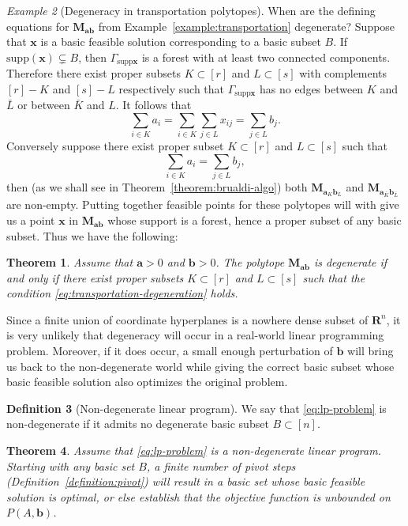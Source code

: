 \documentclass{amsbook}
\newcommand{\xx}{\mathbf x}
\newcommand{\bb}{\mathbf b}
\renewcommand{\aa}{\mathbf a}
\newcommand{\supp}{\mathrm{supp}}
\newcommand{\RR}{\mathbf R}
\newcommand{\MM}{\mathbf M}
\newtheorem{theorem}{Theorem}[section]
\theoremstyle{definition}
\newtheorem{definition}[theorem]{Definition}
\theoremstyle{remark}
\newtheorem{example}[theorem]{Example}
\begin{document}
\begin{example}
  [Degeneracy in transportation polytopes]
  When are the defining equations for $\MM_{\aa\bb}$ from Example~\ref{example:transportation} degenerate?
  Suppose that $\xx$ is a basic feasible solution corresponding to a basic subset $B$.
  If $\supp(\xx)\subsetneq B$, then $\Gamma_{\supp\xx}$ is a forest with at least two connected components.
  Therefore there exist proper subsets $K\subset [r]$ and $L\subset [s]$ with complements $[r]-K$ and $[s]-L$ respectively such that $\Gamma_{\supp\xx}$ has no edges between $K$ and $\bar L$ or between $\bar K$ and $L$.
  It follows that
  \begin{displaymath}
    \sum_{i\in K} a_i = \sum_{i\in K}\sum_{j\in L} x_{ij} = \sum_{j\in L} b_j.
  \end{displaymath}
  Conversely suppose there exist proper subset $K\subset [r]$ and $L\subset [s]$ such that
  \begin{equation}
    \label{eq:transportation-degeneration}
    \sum_{i\in K}a_i = \sum_{j\in L} b_j,
  \end{equation}
  then (as we shall see in Theorem~\ref{theorem:brualdi-algo}) both $\MM_{\aa_K\bb_L}$ and $\MM_{\aa_{\bar K}\bb_{\bar L}}$ are non-empty.
  Putting together feasible points for these polytopes will with give us a point $\xx$ in $\MM_{\aa\bb}$ whose support is a forest, hence a proper subset of any basic subset.
  Thus we have the following:
  \begin{theorem}
    Assume that $\aa>0$ and $\bb>0$.
    The polytope $\MM_{\aa\bb}$ is degenerate if and only if there exist proper subsets $K\subset [r]$ and $L\subset [s]$ such that the condition \eqref{eq:transportation-degeneration} holds.
  \end{theorem}
\end{example}
Since a finite union of coordinate hyperplanes is a nowhere dense subset of $\RR^n$, it is very unlikely that degeneracy will occur in a real-world linear programming problem.
Moreover, if it does occur, a small enough perturbation of $\bb$ will bring us back to the non-degenerate world while giving the correct basic subset whose basic feasible solution also optimizes the original problem.
\begin{definition}[Non-degenerate linear program]
  We say that \eqref{eq:lp-problem} is non-degenerate if it admits no degenerate basic subset $B\subset[n]$.
\end{definition}
\begin{theorem}
  Assume that \eqref{eq:lp-problem} is a non-degenerate linear program.
  Starting with any basic set $B$, a finite number of pivot steps (Definition~\ref{definition:pivot}) will result in a basic set whose basic feasible solution is optimal, or else establish that the objective function is unbounded on $P(A,\bb)$.
\end{theorem}
\end{document}
